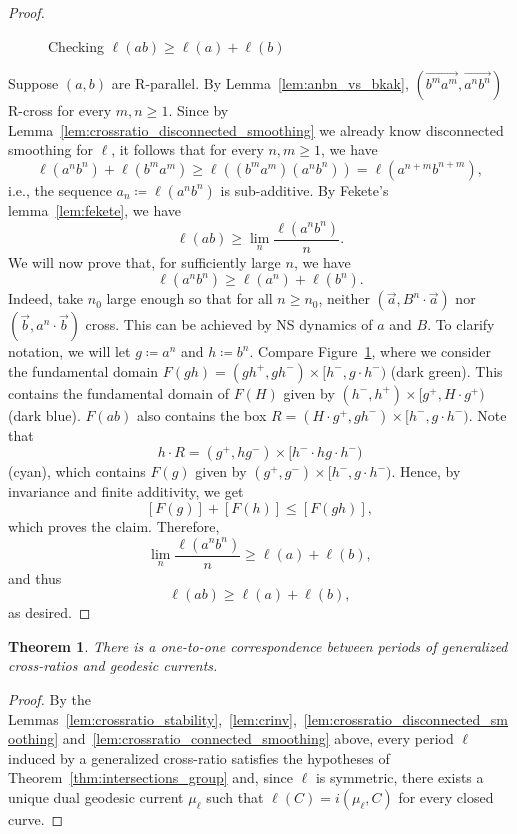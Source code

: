 \documentclass[11pt]{amsart}
\newcommand{\ora}[1]{\overrightarrow{#1}}
\newcommand*{\svgfignormal}[1]{\fontsize{9pt}{9pt}\selectfont}
\numberwithin{equation}{section}
\numberwithin{figure}{section}
\newtheorem{theorem}{Theorem}[section]
\theoremstyle{definition}
\theoremstyle{plain}
\begin{document}
\begin{proof}


    \begin{figure}[ht!]
     \centering
\resizebox{80mm}{!}{\svgfignormal{c8}}
    \caption{Checking $\ell(ab) \geq \ell(a) + \ell(b)$}\label{fig:c8}
\end{figure} 
Suppose $(a,b)$ are R-parallel. By Lemma~\ref{lem:anbn_vs_bkak}, $(\ora{b^m a^m}, \ora{a^nb^n})$ R-cross for every $m,n \geq 1$.
Since by Lemma~\ref{lem:crossratio_disconnected_smoothing} we already know disconnected smoothing for $\ell$, it follows that for every $n,m \geq 1$, we have
\[
\ell(a^n b^n) + \ell(b^m a^m) \geq \ell((b^m a^m)(a^n b^n)) = \ell(a^{n+m}b^{n+m}),
\]
i.e., the sequence $a_n \coloneqq \ell(a^n b^n)$ is sub-additive. By Fekete's lemma~\ref{lem:fekete}, 
we have
\[
\ell(ab) \geq \lim_n \frac{\ell(a^nb^n)}{n}.
\]
We will now prove that, for sufficiently large $n$, we have
\[
\ell(a^nb^n) \geq \ell(a^n) + \ell(b^n).
\]
Indeed, take $n_0$ large enough so that for all $n \geq n_0$, neither $(\ora{a}, B^n \cdot \ora{a})$ nor $(\ora{b}, a^n \cdot \ora{b})$ cross. 
This can be achieved by NS dynamics of $a$ and $B$. To clarify
notation, we will let $g \coloneqq a^n$ and $h \coloneqq b^n$. Compare
Figure~\ref{fig:c8}, where we consider the fundamental domain $F(gh) =
(gh^+, gh^-) \times [h^-, g\cdot h^-)$ (dark green).
This contains the fundamental domain of $F(H)$ given by $(h^-, h^+) \times [g^+, H \cdot g^+)$ (dark blue). $F(ab)$ also contains the box $R=(H \cdot g^+, gh^-) \times [h^-, g \cdot h^-)$. Note that
\[
h \cdot R = (g^+, hg^-) \times [h^- \cdot hg \cdot h^-)
\]
(cyan), which contains $F(g)$ given by $(g^+, g^-) \times [h^-, g \cdot h^-)$.
Hence, by invariance and finite additivity, we get
\[
[F(g)] + [F(h)] \leq [F(gh)],
\]
which proves the claim.
Therefore, 
\[
\lim_n \frac{\ell(a^nb^n)}{n} \geq \ell(a) + \ell(b),
\]
and thus
\[
\ell(ab) \geq \ell(a) + \ell(b),
\]
as desired.
\end{proof}

\begin{theorem}
There is a one-to-one correspondence between periods of generalized cross-ratios and geodesic currents.
\end{theorem}
\begin{proof}
By the Lemmas~\ref{lem:crossratio_stability},~\ref{lem:crinv},~\ref{lem:crossratio_disconnected_smoothing} and~\ref{lem:crossratio_connected_smoothing} above, every period $\ell$ induced by a generalized cross-ratio satisfies the hypotheses of Theorem~\ref{thm:intersections_group} and, since $\ell$ is symmetric, there exists a unique dual geodesic current $\mu_{\ell}$ such that $\ell(C)=i(\mu_{\ell},C)$ for every closed curve.
\end{proof}
\end{document}
